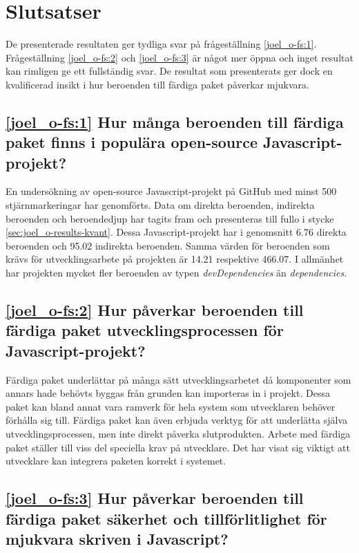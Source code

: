 \section{Slutsatser}
\label{sec:joel_o-conclusion}
De presenterade resultaten ger tydliga svar på frågeställning \ref{joel_o-fs:1}. Frågeställning \ref{joel_o-fs:2} och \ref{joel_o-fs:3} är något mer öppna och inget resultat kan rimligen ge ett fullständig svar. De resultat som presenterats ger dock en kvalificerad insikt i hur beroenden till färdiga paket påverkar mjukvara.

\subsection*{\ref{joel_o-fs:1} Hur många beroenden till färdiga paket finns i populära open-source Javascript-projekt?}

En undersökning av open-source Javascript-projekt på GitHub med minst 500 stjärnmarkeringar har genomförts. Data om direkta beroenden, indirekta beroenden och beroendedjup har tagits fram och presenteras till fullo i stycke \ref{sec:joel_o-results-kvant}. Dessa Javascript-projekt har i genomsnitt 6.76 direkta beroenden och 95.02 indirekta beroenden. Samma värden för beroenden som krävs för utvecklingsarbete på projekten är 14.21 respektive 466.07. I allmänhet har projekten mycket fler beroenden av typen \textit{devDependencies} än \textit{dependencies}.

\subsection*{\ref{joel_o-fs:2} Hur påverkar beroenden till färdiga paket utvecklingsprocessen för Javascript-projekt?}

Färdiga paket underlättar på många sätt utvecklingsarbetet då komponenter som annars hade behövts byggas från grunden kan importeras in i projekt. Dessa paket kan bland annat vara ramverk för hela system som utvecklaren behöver förhålla sig till. Färdiga paket kan även erbjuda verktyg för att underlätta själva utvecklingsprocessen, men inte direkt påverka slutprodukten. Arbete med färdiga paket ställer till viss del speciella krav på utvecklare. Det har visat sig viktigt att utvecklare kan integrera paketen korrekt i systemet.

\subsection*{\ref{joel_o-fs:3} Hur påverkar beroenden till färdiga paket säkerhet och tillförlitlighet för mjukvara skriven i Javascript?}

